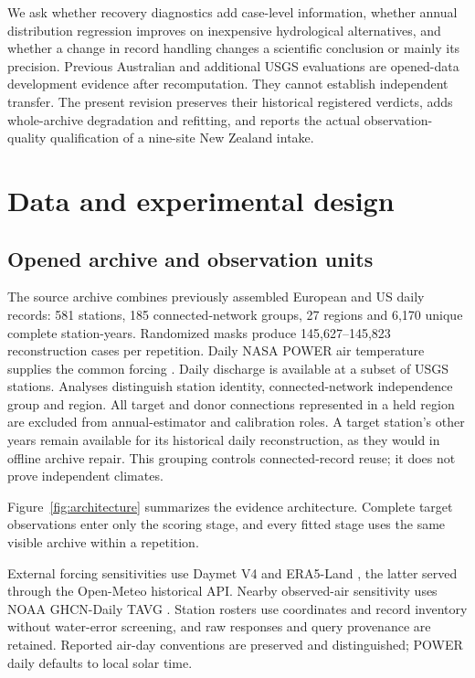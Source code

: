 \documentclass[draft,linenumbers]{agujournal2025}
\begin{document}
We ask whether recovery diagnostics add case-level information, whether annual distribution regression improves on inexpensive hydrological alternatives, and whether a change in record handling changes a scientific conclusion or mainly its precision. Previous Australian and additional USGS evaluations are opened-data development evidence after recomputation. They cannot establish independent transfer. The present revision preserves their historical registered verdicts, adds whole-archive degradation and refitting, and reports the actual observation-quality qualification of a nine-site New Zealand intake.

\section{Data and experimental design}
\subsection{Opened archive and observation units}
The source archive combines previously assembled European and US daily records: 581 stations, 185 connected-network groups, 27 regions and 6,170 unique complete station-years. Randomized masks produce 145,627--145,823 reconstruction cases per repetition. Daily NASA POWER air temperature supplies the common forcing \cite{nasapower2026}. Daily discharge is available at a subset of USGS stations. Analyses distinguish station identity, connected-network independence group and region. All target and donor connections represented in a held region are excluded from annual-estimator and calibration roles. A target station's other years remain available for its historical daily reconstruction, as they would in offline archive repair. This grouping controls connected-record reuse; it does not prove independent climates.

Figure~\ref{fig:architecture} summarizes the evidence architecture. Complete target observations enter only the scoring stage, and every fitted stage uses the same visible archive within a repetition.


External forcing sensitivities use Daymet V4 \cite{thornton2021daymet} and ERA5-Land \cite{munoz2021era5land}, the latter served through the Open-Meteo historical API. Nearby observed-air sensitivity uses NOAA GHCN-Daily TAVG \cite{menne2012ghcn,menne2012ghcndata}. Station rosters use coordinates and record inventory without water-error screening, and raw responses and query provenance are retained. Reported air-day conventions are preserved and distinguished; POWER daily defaults to local solar time.
\end{document}
